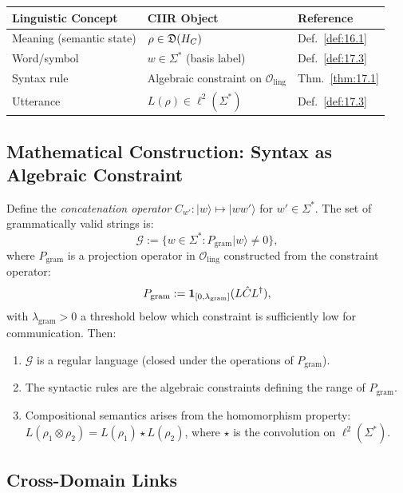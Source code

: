 \begin{center}
\begin{tabular}{lll}
\toprule
\textbf{Linguistic Concept} & \textbf{CIIR Object} & \textbf{Reference} \\
\midrule
Meaning (semantic state) & $\rho \in \mathfrak{D}(H_C)$ & Def.~\ref{def:16.1} \\
Word/symbol & $w \in \Sigma^*$ (basis label) & Def.~\ref{def:17.3} \\
Syntax rule & Algebraic constraint on $\mathcal{O}_{\mathrm{ling}}$ & Thm.~\ref{thm:17.1} \\
Utterance & $L(\rho) \in \ell^2(\Sigma^*)$ & Def.~\ref{def:17.3} \\
\bottomrule
\end{tabular}
\end{center}

\subsection{Mathematical Construction: Syntax as Algebraic Constraint}

\begin{theorem}\label{thm:17.1}
Define the \emph{concatenation operator} $C_{w'} : |w\rangle \mapsto
|ww'\rangle$ for $w' \in \Sigma^*$.  The set of grammatically valid
strings is:
\[
  \mathcal{G} := \bigl\{ w \in \Sigma^* :
  P_{\mathrm{gram}} |w\rangle \neq 0 \bigr\},
\]
where $P_{\mathrm{gram}}$ is a projection operator in
$\mathcal{O}_{\mathrm{ling}}$ constructed from the constraint
operator:
\[
  P_{\mathrm{gram}} := \mathbf{1}_{[0,\lambda_{\mathrm{gram}}]}(L \hat{C} L^\dagger),
\]
with $\lambda_{\mathrm{gram}} > 0$ a threshold below which
constraint is sufficiently low for communication.  Then:
\begin{enumerate}
  \item[\textup{(i)}] $\mathcal{G}$ is a regular language (closed under
    the operations of $P_{\mathrm{gram}}$).
  \item[\textup{(ii)}] The syntactic rules are the algebraic
    constraints defining the range of $P_{\mathrm{gram}}$.
  \item[\textup{(iii)}] Compositional semantics arises from the
    homomorphism property:
    $L(\rho_1 \otimes \rho_2) = L(\rho_1) \star L(\rho_2)$,
    where $\star$ is the convolution on $\ell^2(\Sigma^*)$.
\end{enumerate}
\end{theorem}

\subsection{Cross-Domain Links}

